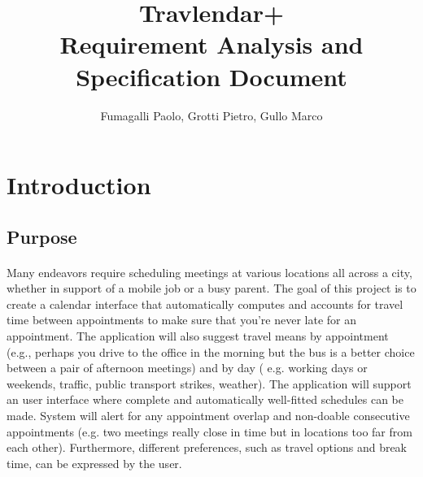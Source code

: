 \documentclass{article}
\title{Travlendar+ \\Requirement Analysis and Specification Document}
\author{Fumagalli Paolo, Grotti Pietro, Gullo Marco}
\begin{document}
\maketitle
\newpage
\tableofcontents
\newpage
{}
\section{Introduction}
\subsection{Purpose}
\paragraph{}
Many endeavors require scheduling meetings at various locations all across a city, whether in support of a mobile job or a busy parent. The goal of this project is to create a calendar interface that automatically computes and accounts for travel time between appointments to make sure that you're never late for an appointment. The application will also suggest travel means by appointment (e.g., perhaps you drive to the office in the morning but the bus is a better choice between a pair of afternoon meetings) and by day ( e.g. working days or weekends, traffic, public transport strikes, weather). The application will support an user interface where complete and automatically well-fitted schedules can be made. System will alert for any appointment overlap and non-doable consecutive appointments (e.g. two meetings really close in time but in locations too far from each other). Furthermore, different preferences, such as travel options and break time, can be expressed by the user.
\end{document}

